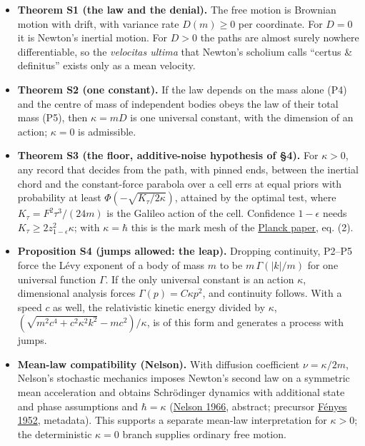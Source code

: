 \documentclass[11pt,a4paper]{article}
\newcommand{\tightlist}{\setlength{\itemsep}{0pt}\setlength{\parskip}{0pt}}
\begin{document}
\begin{itemize}
\tightlist
\item
  \textbf{Theorem S1 (the law and the denial).} The free motion is
  Brownian motion with drift, with variance rate \(D(m)\ge0\) per
  coordinate. For \(D=0\) it is Newton's inertial motion. For \(D>0\)
  the paths are almost surely nowhere differentiable, so the
  \emph{velocitas ultima} that Newton's scholium calls ``certus \&
  definitus'' exists only as a mean velocity.
\item
  \textbf{Theorem S2 (one constant).} If the law depends on the mass
  alone (P4) and the centre of mass of independent bodies obeys the law
  of their total mass (P5), then \(\kappa=mD\) is one universal
  constant, with the dimension of an action; \(\kappa=0\) is admissible.
\item
  \textbf{Theorem S3 (the floor, additive-noise hypothesis of §4).} For
  \(\kappa>0\), any record that decides from the path, with pinned ends,
  between the inertial chord and the constant-force parabola over a cell
  errs at equal priors with probability at least
  \(\Phi(-\sqrt{K_\tau/2\kappa})\), attained by the optimal test, where
  \(K_\tau=F^2\tau^3/(24m)\) is the Galileo action of the cell.
  Confidence \(1-\epsilon\) needs \(K_\tau\ge2z_{1-\epsilon}^2\kappa\);
  with \(\kappa=\hbar\) this is the mark mesh of the
  \href{planck-gap-paper.md}{Planck paper}, eq. (2).
\item
  \textbf{Proposition S4 (jumps allowed: the leap).} Dropping
  continuity, P2--P5 force the Lévy exponent of a body of mass \(m\) to
  be \(m\,\Gamma(|k|/m)\) for one universal function \(\Gamma\). If the
  only universal constant is an action \(\kappa\), dimensional analysis
  forces \(\Gamma(p)=C\kappa p^2\), and continuity follows. With a speed
  \(c\) as well, the relativistic kinetic energy divided by \(\kappa\),
  \((\sqrt{m^2c^4+c^2\kappa^2k^2}-mc^2)/\kappa\), is of this form and
  generates a process with jumps.
\item
  \textbf{Mean-law compatibility (Nelson).} With diffusion coefficient
  \(\nu=\kappa/2m\), Nelson's stochastic mechanics imposes Newton's
  second law on a symmetric mean acceleration and obtains Schrödinger
  dynamics with additional state and phase assumptions and
  \(\hbar=\kappa\)
  (\href{https://doi.org/10.1103/PhysRev.150.1079}{Nelson 1966},
  abstract; precursor \href{https://doi.org/10.1007/BF01338578}{Fényes
  1952}, metadata). This supports a separate mean-law interpretation for
  \(\kappa>0\); the deterministic \(\kappa=0\) branch supplies ordinary
  free motion.
\end{itemize}
\end{document}
